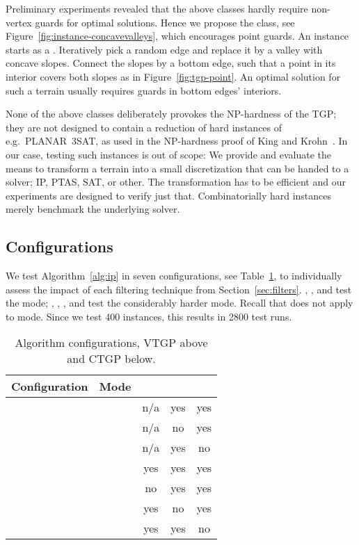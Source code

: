 Preliminary experiments revealed that the above classes hardly require non-vertex guards for optimal solutions.
Hence we propose the \concavevalleys class, see Figure~\ref{fig:instance-concavevalleys}, which encourages point guards.
An instance starts as a \walk.
Iteratively pick a random edge and replace it by a valley with concave slopes.
Connect the slopes by a bottom edge, such that a point in its interior covers both slopes as in Figure~\ref{fig:tgp-point}.
An optimal solution for such a terrain usually requires guards in bottom edges' interiors.

None of the above classes deliberately provokes the NP-hardness of the \ac{TGP};
they are not designed to contain a reduction of hard instances of e.g.\ {PLANAR~3SAT}, as used in the NP-hardness proof of King and Krohn~\cite{kk-tginph-11}.
In our case, testing such instances is out of scope:
We provide and evaluate the means to transform a terrain into a small discretization that can be handed to a solver; \ac{IP}, \ac{PTAS}, {SAT}, or other.
The transformation has to be efficient and our experiments are designed to verify just that.
Combinatorially hard instances merely benchmark the underlying solver.

\subsection{Configurations}
\label{sec:configurations}

We test Algorithm~\ref{alg:ip} in seven configurations, see Table~\ref{tab:config}, to individually assess the impact of each filtering technique from Section~\ref{sec:filters}.
\vdefault, \vnodom, and \vnow test the \vertexguardmode mode;
\pdefault, \pnoedge, \pnodom, and \pnow test the considerably harder \pointguardmode mode.
Recall that \pointguardfilter does not apply to \vertexguardmode mode.
Since we test 400 instances, this results in 2800 test runs.

\begin{table}
	\centering
	\small
	\begin{tabular}{|l|c|c|c|c|}
		\hline
		Configuration & Mode & \pointguardfilter & \domfilter & \witnessfilter \\
		\hline
		\hline
		\vdefault & \vertexguardmode & n/a & yes & yes \\
		\hline
		\vnodom   & \vertexguardmode & n/a &  no & yes \\
		\hline
		\vnow     & \vertexguardmode & n/a & yes &  no \\
		\hline
		\hline
		\pdefault & \pointguardmode  & yes & yes & yes \\
		\hline
		\pnoedge  & \pointguardmode  &  no & yes & yes \\
		\hline
		\pnodom   & \pointguardmode  & yes &  no & yes \\
		\hline
		\pnow     & \pointguardmode  & yes & yes &  no \\
		\hline
	\end{tabular}
	\caption{Algorithm configurations, \acs{VTGP} above and \acs{CTGP} below.}
	\label{tab:config}
\end{table}

